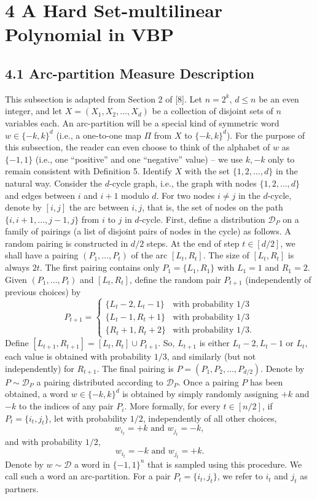 \documentclass[10pt,a4paper]{article}
\begin{document}
\section*{4 A Hard Set-multilinear Polynomial in VBP}
\subsection*{4.1 Arc-partition Measure Description}
This subsection is adapted from Section 2 of [8]. Let $n=2^k$, $d\leq n$ be an even integer, and let $X=(X_1,X_2,\ldots,X_d)$ be a collection of disjoint sets of $n$ variables each. An arc-partition will be a special kind of symmetric word $w\in\{-k,k\}^d$ (i.e., a one-to-one map $\Pi$ from $X$ to $\{-k,k\}^d$). For the purpose of this subsection, the reader can even choose to think of the alphabet of $w$ as $\{-1,1\}$ (i.e., one ``positive'' and one ``negative'' value) -- we use $k,-k$ only to remain consistent with Definition 5.
Identify $X$ with the set $\{1,2,\ldots,d\}$ in the natural way. Consider the $d$-cycle graph, i.e., the graph with nodes $\{1,2,\ldots,d\}$ and edges between $i$ and $i+1$ modulo $d$. For two nodes $i\neq j$ in the $d$-cycle, denote by $[i,j]$ the arc between $i,j$, that is, the set of nodes on the path $\{i,i+1,\ldots,j-1,j\}$ from $i$ to $j$ in $d$-cycle. First, define a distribution $\mathcal D_P$ on a family of pairings (a list of disjoint pairs of nodes in the cycle) as follows. A random pairing is constructed in $d/2$ steps. At the end of step $t\in[d/2]$, we shall have a pairing $(P_1,\ldots,P_t)$ of the arc $[L_t,R_t]$. The size of $[L_t,R_t]$ is always $2t$. The first pairing contains only $P_1=\{L_1,R_1\}$ with $L_1=1$ and $R_1=2$. Given $(P_1,\ldots,P_t)$ and $[L_t,R_t]$, define the random pair $P_{t+1}$ (independently of previous choices) by
\[P_{t+1}=\begin{cases}\{L_t-2,L_t-1\}&\text{with probability }1/3\\\{L_t-1,R_t+1\}&\text{with probability }1/3\\\{R_t+1,R_t+2\}&\text{with probability }1/3.\end{cases}\]
Define $[L_{t+1},R_{t+1}]=[L_t,R_t]\cup P_{t+1}$. So, $L_{t+1}$ is either $L_t-2,L_t-1$ or $L_t$, each value is obtained with probability $1/3$, and similarly (but not independently) for $R_{t+1}$.
The final pairing is $P=(P_1,P_2,\ldots,P_{d/2})$. Denote by $P\sim\mathcal D_P$ a pairing distributed according to $\mathcal D_P$.
Once a pairing $P$ has been obtained, a word $w\in\{-k,k\}^d$ is obtained by simply randomly assigning $+k$ and $-k$ to the indices of any pair $P_i$. More formally, for every $t\in[n/2]$, if $P_t=\{i_t,j_t\}$, let with probability $1/2$, independently of all other choices,
\[w_{i_t}=+k\text{ and }w_{j_t}=-k,\]
and with probability $1/2$,
\[w_{i_t}=-k\text{ and }w_{j_t}=+k.\]
Denote by $w\sim\mathcal D$ a word in $\{-1,1\}^n$ that is sampled using this procedure. We call such a word an arc-partition. For a pair $P_t=\{i_t,j_t\}$, we refer to $i_t$ and $j_t$ as partners.
\end{document}
